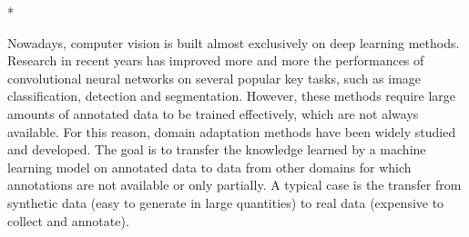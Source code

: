 \documentclass[%
    corpo=12pt,
    twoside,
    stile=classica,   
    tipotesi=magistrale,
    evenboxes,
    english,
	numerazioneromana,
]{toptesi}
\begin{document}
\english

\begin{ThesisTitlePage}*
% 
\def\Candidato{Candidate}

\end{ThesisTitlePage}

\paginavuota

\sommario
Nowadays, computer vision is built almost exclusively on deep learning methods. Research in recent years has improved more and more the performances of convolutional neural networks on several popular key tasks, such as image classification, detection and segmentation. However, these methods require large amounts of annotated data to be trained effectively, which are not always available.
For this reason, domain adaptation methods have been widely studied and developed. The goal is to transfer the knowledge learned by a machine learning model on annotated data to data from other domains for which annotations are not available or only partially. A typical case is the transfer from synthetic data (easy to generate in large quantities) to real data (expensive to collect and annotate).
\end{document}

